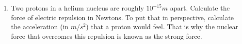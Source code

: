 \documentclass[fleqn]{article}
\begin{document}
\begin{enumerate}
\begin{enumerate}
      \item Two protons in a helium nucleus are roughly $10^{-15}m$ apart. Calculate the force of 
      electric repulsion in Newtons. To put that in perspective, calculate the acceleration (in $m/s^2$) that a proton
      would feel. That is why the nuclear force that overcomes this repulsion is known as the strong force.


    \end{enumerate}

  \end{enumerate}
\end{document}
